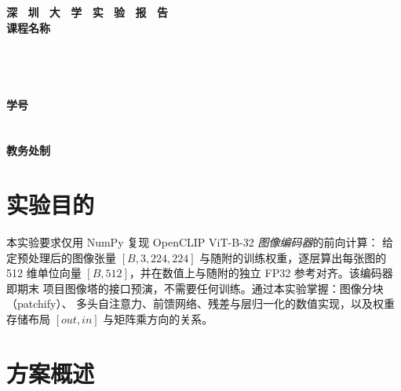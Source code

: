 \documentclass[a4paper,12pt]{article}
\begin{document}
\begin{titlepage}
    \centering
    \vspace*{2cm}
    \Huge{\textbf{深 \ 圳 \ 大 \ 学 \ 实 \ 验  \ 报 \ 告}}\\[1.5cm]
    {\Large\textbf{课程名称}\quad\underline{}}\\[0.5cm]
    {\Large
    \noindent{}
    \underline{}}\\[0.5cm]
    {\Large
    \noindent{}
    \underline{}}\\[0.5cm]
    {\Large
    \noindent{}
    \underline{\makebox[8cm][c]{}}}\\[0.5cm]
    {\Large
    \noindent{}
    \underline{}}\\[0.5cm]
    {\Large
    \noindent{}
    \underline{\makebox[3cm][c]{}}
    \hspace{0.5cm}
    \textbf{学号}
    \underline{\makebox[3cm][c]{}}}\\[0.5cm]
    {\Large
    \noindent{}
    \underline{\makebox[8cm][c]{}}}\\[0.5cm]
    {\Large
    \noindent{}
    \underline{\makebox[8cm][c]{}}}\\[1.5cm]
    \vfill
    \Large{\textbf{教务处制}}
\end{titlepage}
\newpage

\section{实验目的}

本实验要求仅用 NumPy 复现 OpenCLIP ViT-B-32 \emph{图像编码器}的前向计算：
给定预处理后的图像张量 $[B,3,224,224]$ 与随附的训练权重，逐层算出每张图的
512 维单位向量 $[B,512]$，并在数值上与随附的独立 FP32 参考对齐。该编码器即期末
项目图像塔的接口预演，不需要任何训练。通过本实验掌握：图像分块（patchify）、
多头自注意力、前馈网络、残差与层归一化的数值实现，以及权重存储布局
$[out,in]$ 与矩阵乘方向的关系。

\section{方案概述}
\end{document}
